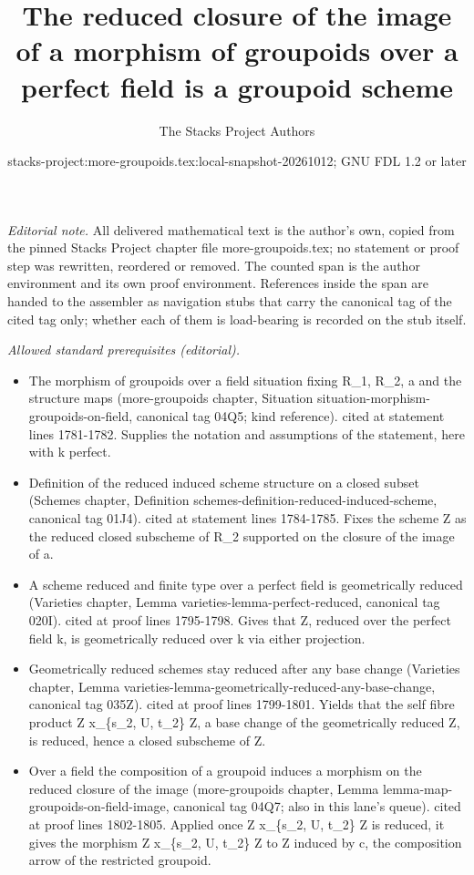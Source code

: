\documentclass{stacks-project}
\title{The reduced closure of the image of a morphism of groupoids over a perfect field is a groupoid scheme}
\author{The Stacks Project Authors}
\date{stacks-project:more-groupoids.tex:local-snapshot-20261012; GNU FDL 1.2 or later}
\theoremstyle{plain}
\theoremstyle{definition}
\theoremstyle{remark}
\numberwithin{equation}{subsection}
\begin{document}
\maketitle
\setcounter{subsection}{1}
\noindent\textit{Editorial note.} All delivered mathematical text is the author's own, copied from the pinned Stacks Project chapter file more-groupoids.tex; no statement or proof step was rewritten, reordered or removed. The counted span is the author environment and its own proof environment. References inside the span are handed to the assembler as navigation stubs that carry the canonical tag of the cited tag only; whether each of them is load-bearing is recorded on the stub itself.\par\medskip
\noindent\textit{Allowed standard prerequisites (editorial).}\begin{itemize}
\item The morphism of groupoids over a field situation fixing R\_1, R\_2, a and the structure maps (more-groupoids chapter, Situation situation-morphism-groupoids-on-field, canonical tag 04Q5; kind reference). cited at statement lines 1781-1782. Supplies the notation and assumptions of the statement, here with k perfect.
\item Definition of the reduced induced scheme structure on a closed subset (Schemes chapter, Definition schemes-definition-reduced-induced-scheme, canonical tag 01J4). cited at statement lines 1784-1785. Fixes the scheme Z as the reduced closed subscheme of R\_2 supported on the closure of the image of a.
\item A scheme reduced and finite type over a perfect field is geometrically reduced (Varieties chapter, Lemma varieties-lemma-perfect-reduced, canonical tag 020I). cited at proof lines 1795-1798. Gives that Z, reduced over the perfect field k, is geometrically reduced over k via either projection.
\item Geometrically reduced schemes stay reduced after any base change (Varieties chapter, Lemma varieties-lemma-geometrically-reduced-any-base-change, canonical tag 035Z). cited at proof lines 1799-1801. Yields that the self fibre product Z x\_\{s\_2, U, t\_2\} Z, a base change of the geometrically reduced Z, is reduced, hence a closed subscheme of Z.
\item Over a field the composition of a groupoid induces a morphism on the reduced closure of the image (more-groupoids chapter, Lemma lemma-map-groupoids-on-field-image, canonical tag 04Q7; also in this lane's queue). cited at proof lines 1802-1805. Applied once Z x\_\{s\_2, U, t\_2\} Z is reduced, it gives the morphism Z x\_\{s\_2, U, t\_2\} Z to Z induced by c, the composition arrow of the restricted groupoid.
\end{itemize}\medskip
\end{document}
